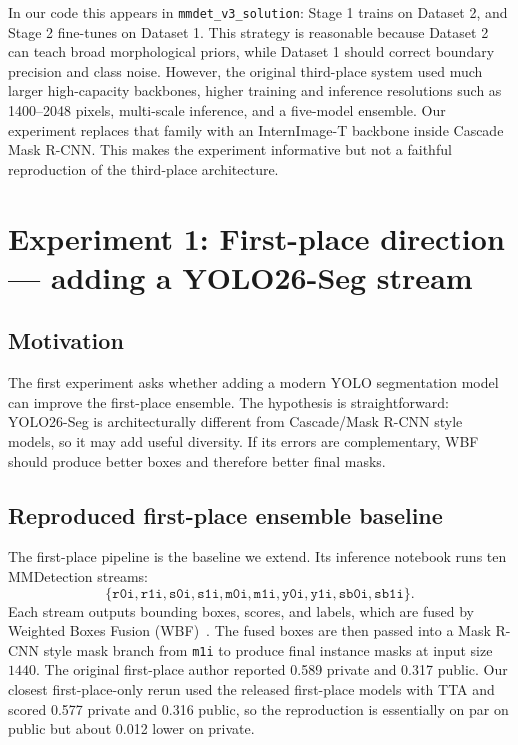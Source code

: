 \documentclass[12pt, a4paper]{article}
\begin{document}
In our code this appears in \texttt{mmdet\_v3\_solution}: Stage 1 trains on Dataset 2, and Stage 2 fine-tunes on Dataset 1. This strategy is reasonable because Dataset 2 can teach broad morphological priors, while Dataset 1 should correct boundary precision and class noise. However, the original third-place system used much larger high-capacity backbones, higher training and inference resolutions such as 1400--2048 pixels, multi-scale inference, and a five-model ensemble. Our experiment replaces that family with an InternImage-T backbone inside Cascade Mask R-CNN. This makes the experiment informative but not a faithful reproduction of the third-place architecture.

\section{Experiment 1: First-place direction --- adding a YOLO26-Seg stream}
\label{sec:yolo}

\subsection{Motivation}

The first experiment asks whether adding a modern YOLO segmentation model can improve the first-place ensemble. The hypothesis is straightforward: YOLO26-Seg is architecturally different from Cascade/Mask R-CNN style models, so it may add useful diversity. If its errors are complementary, WBF should produce better boxes and therefore better final masks.

\subsection{Reproduced first-place ensemble baseline}

The first-place pipeline is the baseline we extend. Its inference notebook runs ten MMDetection streams:
\[
\{\texttt{r0i}, \texttt{r1i}, \texttt{s0i}, \texttt{s1i}, \texttt{m0i}, \texttt{m1i}, \texttt{y0i}, \texttt{y1i}, \texttt{sb0i}, \texttt{sb1i}\}.
\]
Each stream outputs bounding boxes, scores, and labels, which are fused by Weighted Boxes Fusion (WBF)~\cite{wbf}. The fused boxes are then passed into a Mask R-CNN style mask branch from \texttt{m1i} to produce final instance masks at input size $1440$. The original first-place author reported 0.589 private and 0.317 public. Our closest first-place-only rerun used the released first-place models with TTA and scored 0.577 private and 0.316 public, so the reproduction is essentially on par on public but about 0.012 lower on private.
\end{document}
